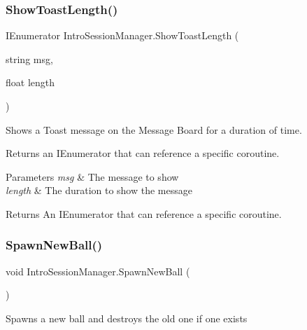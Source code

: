 \subsubsection{\texorpdfstring{Show\+Toast\+Length()}{ShowToastLength()}}
{\footnotesize\ttfamily I\+Enumerator Intro\+Session\+Manager.\+Show\+Toast\+Length (\begin{DoxyParamCaption}\item[{string}]{msg,  }\item[{float}]{length }\end{DoxyParamCaption})\hspace{0.3cm}{\ttfamily [private]}}



Shows a Toast message on the Message Board for a duration of time. 

Returns an I\+Enumerator that can reference a specific coroutine.


\begin{DoxyParams}{Parameters}
{\em msg} & The message to show\\
\hline
{\em length} & The duration to show the message\\
\hline
\end{DoxyParams}
\begin{DoxyReturn}{Returns}
An I\+Enumerator that can reference a specific coroutine.
\end{DoxyReturn}
\mbox{\label{class_intro_session_manager_ab234b0587ea8c4283121ac8103ef67e1}} 
\subsubsection{\texorpdfstring{Spawn\+New\+Ball()}{SpawnNewBall()}}
{\footnotesize\ttfamily void Intro\+Session\+Manager.\+Spawn\+New\+Ball (\begin{DoxyParamCaption}{ }\end{DoxyParamCaption})}



Spawns a new ball and destroys the old one if one exists 

\mbox{\label{class_intro_session_manager_af44cc6aa8fff0329411659f44ba29475}} 

